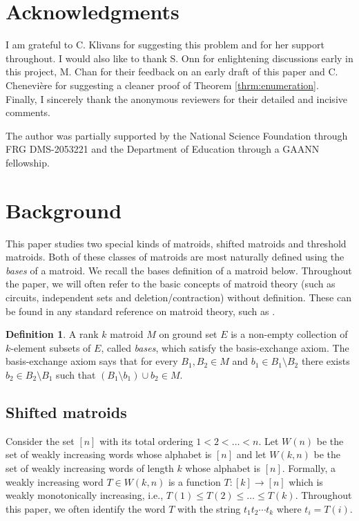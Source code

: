 \documentclass{amsart}
\theoremstyle{definition}
\newtheorem{defn}{Definition}[section]
\theoremstyle{plain}
\begin{document}
\section*{Acknowledgments}
I am grateful to C. Klivans for suggesting this problem and for her support throughout. I would also like to thank S. Onn for enlightening discussions early in this project, M. Chan for their feedback on an early draft of this paper and C. Chenevière for suggesting a cleaner proof of Theorem \ref{thrm:enumeration}. Finally, I sincerely thank the anonymous reviewers for their detailed and incisive comments.

The author was partially supported by the National Science Foundation through FRG
DMS-2053221 and the Department of Education through a GAANN fellowship.


\section{Background}
\label{sec:back}

This paper studies two special kinds of matroids, shifted matroids and threshold matroids. Both of these classes of matroids are most naturally defined using the \emph{bases} of a matroid. We recall the bases definition of a matroid below. Throughout the paper, we will often refer to the basic concepts of matroid theory (such as circuits, independent sets and deletion/contraction) without definition. These can be found in any standard reference on matroid theory, such as \cite{oxley}.

\begin{defn}\label{defn:matroid}
A rank $k$ matroid $M$ on ground set $E$ is a non-empty collection of $k$-element subsets of $E$, called \emph{bases}, which satisfy the basis-exchange axiom. The basis-exchange axiom says that for every $B_1,B_2\in M$ and $b_1\in B_1\setminus B_2$ there exists $b_2\in B_2\setminus B_1$ such that $(B_1\setminus b_1)\cup b_2 \in M$.
\end{defn}

\subsection{Shifted matroids}
Consider the set $[n]$ with its total ordering $1<2<\ldots <n$. Let $W(n)$ be the set of weakly increasing words whose alphabet is $[n]$ and let $W(k,n)$ be the set of weakly increasing words of length $k$ whose alphabet is $[n]$. Formally, a weakly increasing word $T\in W(k,n)$ is a function $T:[k]\to [n]$ which is weakly monotonically increasing, i.e., $T(1) \leq T(2) \leq \ldots \leq T(k)$. Throughout this paper, we often identify the word $T$ with the string $t_1 t_2 \cdots t_k$ where $t_i= T(i)$.
\end{document}

